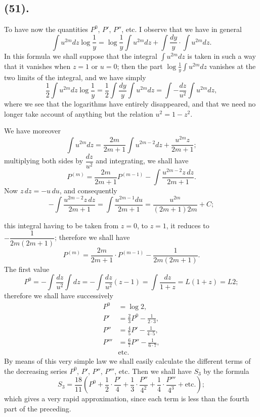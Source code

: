 \documentclass{article}
\begin{document}
\subsection*{(51).}

To have now the quantities $P^{0}$, $P'$, $P''$, etc. I observe that we have in general
\[ \int u^{2m}dz\log\frac{1}{y}=\log\frac{1}{y}\int u^{2m}dz+\int\frac{dy}{y}\cdot\int u^{2m}dz. \]
In this formula we shall suppose that the integral $\displaystyle\int u^{2m}dz$ is taken in such a way that it vanishes when $z=1$ or $u=0$; then the part $\displaystyle\log\frac{1}{y}\int u^{2m}dz$ vanishes at the two limits of the integral, and we have simply
\[ \frac{1}{2}\int u^{2m}dz\log\frac{1}{y}=\frac{1}{2}\int\frac{dy}{y}\int u^{2m}dz=\int-\frac{dz}{u^{2}}\int u^{2m}dz, \]
where we see that the logarithms have entirely disappeared, and that we need no longer take account of anything but the relation $u^{2}=1-z^{2}$.

We have moreover
\[ \int u^{2m}dz=\frac{2m}{2m+1}\int u^{2m-2}dz+\frac{u^{2m}z}{2m+1}; \]
multiplying both sides by $\dfrac{dz}{u^{2}}$ and integrating, we shall have
\[ P^{(m)}=\frac{2m}{2m+1}P^{(m-1)}-\int\frac{u^{2m-2}z\,dz}{2m+1}. \]
Now $z\,dz=-u\,du$, and consequently
\[ -\int\frac{u^{2m-2}z\,dz}{2m+1}=\int\frac{u^{2m-1}du}{2m+1}=\frac{u^{2m}}{(2m+1)2m}+C; \]

this integral having to be taken from $z=0$, to $z=1$, it reduces to $-\dfrac{1}{2m(2m+1)}$; therefore we shall have
\[ P^{(m)}=\frac{2m}{2m+1}\cdot P^{(m-1)}-\frac{1}{2m(2m+1)}. \]
The first value
\[ P^{0}=-\int\frac{dz}{u^{2}}\int dz=-\int\frac{dz}{u^{2}}(z-1)=\int\frac{dz}{1+z}=L(1+z)=L2; \]
therefore we shall have successively
\[ \begin{aligned} P^{0}&=\log 2,\\ P'&=\frac{2}{3}P^{0}-\frac{1}{2\cdot 3},\\ P''&=\frac{4}{5}P'-\frac{1}{4\cdot 5},\\ P'''&=\frac{6}{7}P''-\frac{1}{6\cdot 7},\\ &\text{etc.} \end{aligned} \]
By means of this very simple law we shall easily calculate the different terms of the decreasing series $P^{0}$, $P'$, $P''$, $P'''$, etc. Then we shall have $S_{3}$ by the formula
\[ S_{3}=\frac{18}{11}\left(P^{0}+\frac{1}{2}\cdot\frac{P'}{4}+\frac{1}{3}\cdot\frac{P''}{4^{2}}+\frac{1}{4}\cdot\frac{P'''}{4^{3}}+\text{etc.}\right); \]
which gives a very rapid approximation, since each term is less than the fourth part of the preceding.
\end{document}
